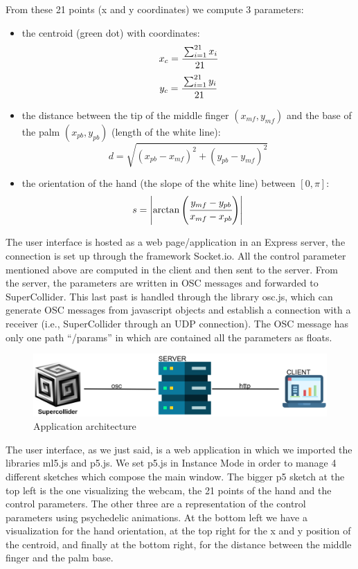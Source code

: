 \documentclass[a4paper,12pt]{report}
\begin{document}
From these 21 points (x and y coordinates) we compute 3 parameters:
\begin{itemize}
	\item the centroid (green dot) with coordinates:
	\[x_c = \cfrac{\sum_{i = 1}^{21}x_i}{21}\]
	\[y_c = \cfrac{\sum_{i = 1}^{21}y_i}{21}\]
	\item the distance between the tip of the middle finger $(x_{mf}, y_{mf})$ and the base of the palm $(x_{pb}, y_{pb})$ (length of the white line): 
	\[d = \sqrt{(x_{pb} - x_{mf})^2 + (y_{pb} - y_{mf})^2}\]
	\item the orientation of the hand (the slope of the white line) between $[0, \pi]$:
	\[s = \left\lvert\arctan{\left(\cfrac {y_{mf} - y_{pb}}{x_{mf} - x_{pb}}\right)}\right\rvert \]
\end{itemize}  

 
The user interface is hosted as a web page/application in an Express server, the connection is set up through the framework Socket.io. All the control parameter mentioned above are computed in the client and then sent to the server. From the server, the parameters are written in OSC messages and forwarded to SuperCollider. This last past is handled through the library osc.js, which can generate OSC messages from javascript objects and establish a connection with a receiver (i.e., SuperCollider through an UDP connection). The OSC message has only one path “/params” in which are contained all the parameters as floats.

\begin{figure}[h]
\centering
\includegraphics[scale=0.4]{arch.png}
\caption{Application architecture}
\end{figure}


The user interface, as we just said, is a web application in which we imported the libraries ml5.js and p5.js.  We set p5.js in Instance Mode in order to manage 4 different sketches which compose the main window. The bigger p5 sketch at the top left is the one visualizing the webcam, the 21 points of the hand and the control parameters. The other three are a representation of the control parameters using psychedelic animations. At the bottom left we have a visualization for the hand orientation, at the top right for the x and y position of the centroid, and finally at the bottom right, for the distance between the middle finger and the palm base.
\end{document}
